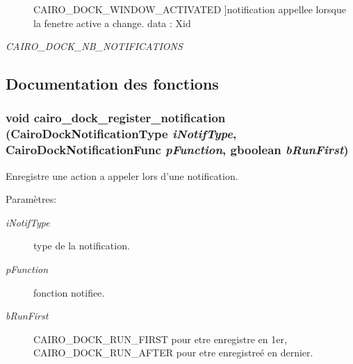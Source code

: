 \begin{Desc}
\begin{description}
{CAIRO\_\-DOCK\_\-WINDOW\_\-ACTIVATED\label{cairo-dock-notifications_8h_183d2bfd296ecf77f1b2d4f96bf20a0e414019822c568115e4c4e832455b92f2}
}]notification appellee lorsque la fenetre active a change. data : Xid \item[{\em 
CAIRO\_\-DOCK\_\-NB\_\-NOTIFICATIONS\label{cairo-dock-notifications_8h_183d2bfd296ecf77f1b2d4f96bf20a0ee191d3469739d849e67b83d6d6433d07}
}]\end{description}
\end{Desc}



\subsection{Documentation des fonctions}
\subsubsection{\setlength{\rightskip}{0pt plus 5cm}void cairo\_\-dock\_\-register\_\-notification ({\bf CairoDockNotificationType} {\em iNotifType}, {\bf CairoDockNotificationFunc} {\em pFunction}, gboolean {\em bRunFirst})}\label{cairo-dock-notifications_8h_845e5c4be6a3a3d1be2de99f9c6a93a6}


Enregistre une action a appeler lors d'une notification. \begin{Desc}
\item[Paramètres:]
\begin{description}
\item[{\em iNotifType}]type de la notification. \item[{\em pFunction}]fonction notifiee. \item[{\em bRunFirst}]CAIRO\_\-DOCK\_\-RUN\_\-FIRST pour etre enregistre en 1er, CAIRO\_\-DOCK\_\-RUN\_\-AFTER pour etre enregistreé en dernier. \end{description}
\end{Desc}
